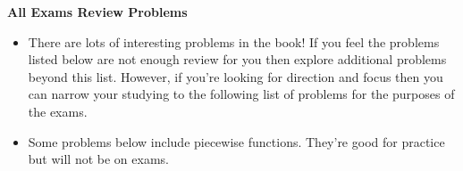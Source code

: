 \documentclass{article}
\begin{document}
\begin{center}{\bf All Exams Review Problems}
\end{center}

\begin{itemize}
\item  There are lots of interesting problems in the book!  If you feel the problems listed below are not enough review for you then explore additional problems beyond this list.  However, if you're looking for direction and focus then you can narrow your studying to the following list of problems for the purposes of  the exams.
\item Some problems below include piecewise functions.  They're good for practice but will not be on exams.
\end{itemize}

\thispagestyle{empty}
\end{document}
